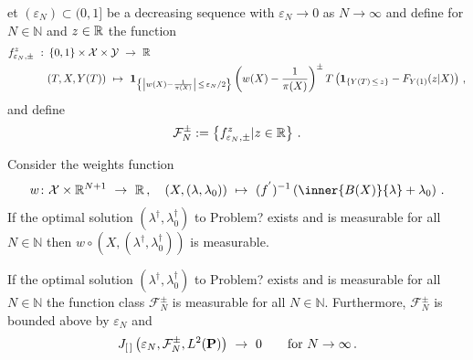 et 
  $(\varepsilon_N)\subset(0,1]$ be a decreasing sequence with 
  $\varepsilon_N\to 0$ as $N\to\infty$ and define for
  $N\in\mathbb{N}$ and $z\in\mathbb{R}$ the function
 \begin{align*}
    f_{\varepsilon_N,\pm}^z
    \ 
    :
    \ 
    &
      \left\{ 0,1 \right\}
      \times
      \mathcal{X}
      \times
      \mathcal{Y}
    \ 
    \to
    \ 
    \R
    \\
    &
      (T,X,Y(T))
      \ 
      \mapsto
      \ 
      \mathbf{1}
      _
      {\left\{ 
          \left|
      w(X)-\frac{1}{\pi(X)}
          \right|
          \,
          \le
          \,
          \varepsilon_N/2
      \right\}}
      \left( 
      w(X)-\frac{1}{\pi(X)}
      \right)
      ^{\pm}
      T
      \left( 
        \mathbf{1}
        _{\left\{  Y(T)\,\le\,z \right\}}
        -
        F_{Y(1)}(z|X)
      \right)
      \,,
  \end{align*}
  and define 
  \begin{gather*}
    \mathcal{F}_N^\pm
    :=
    \left\{ 
    f_{\varepsilon_N,\pm}^z
    |
    z\in\mathbb{R}
    \right\}
    \,.
  \end{gather*}
\begin{lemma}
  Consider the weights function
  \begin{align*}
    w
    \colon
    \mathcal{X}
    \times
    \R^{N+1}
    \ 
    \to
    \ 
    \R
    \,,
    \quad
    (X,(\lambda,\lambda_0))
    \ 
    \mapsto
    \ 
    (
    f^{'}
    )^{-1}
    \left( 
      \inner{B(X)}{\lambda}
      +
      \lambda_0
    \right)
    \,.
  \end{align*}
    If the optimal solution 
    $
    (\lambda^\dagger,\lambda_0^\dagger)
    $ to Problem? exists and is measurable for all $N\in\mathbb{N}$ 
    then $
    w
    \circ
    (
    X
    ,
    (\lambda^\dagger,\lambda_0^\dagger)
    )
    $
    is measurable.
\end{lemma}
\begin{lemma}
  \label{bounded_f_lemma}
    If the optimal solution $(\lambda^\dagger,\lambda_0^\dagger)$ to Problem? exists and is measurable for all $N\in\mathbb{N}$ 
  the function class
  $
    \mathcal{F}_N^\pm
  $
    is measurable for all $N\in\mathbb{N}$.
    Furthermore, $\mathcal{F}_N^\pm$ is bounded above by $\varepsilon_N$ and
    \begin{gather*}
     J_{[\, ]}
    \left( 
      \varepsilon_N
    ,
    \mathcal{F}_N^\pm
    ,
     L^2(\P)
    \right)
    \ 
    \to
    \ 
    0
    \qquad
    \text{for}
    \ 
    N
    \to
    \infty
\,. 
    \end{gather*}
\end{lemma}
